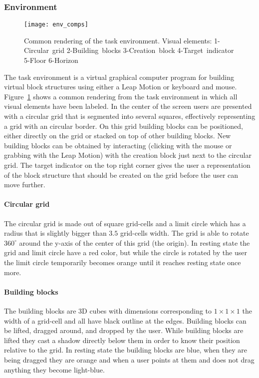 \subsubsection{Environment}

\begin{figure}[H]
\centering
\texttt{[image: env\_comps]}
\caption{\label{fig:environmentcomps} Common rendering of the task environment. Visual elements: 1-Circular~grid 2-Building~blocks 3-Creation~block 4-Target~indicator 5-Floor 6-Horizon}
\end{figure}

\noindent The task environment is a virtual graphical computer program for building virtual block structures using either a Leap Motion or keyboard and mouse. Figure~\ref{fig:environmentcomps} shows a common rendering from the task environment in which all visual elements have been labeled. In the center of the screen users are presented with a circular grid that is segmented into several squares, effectively representing a grid with an circular border. On this grid building blocks can be positioned, either directly on the grid or stacked on top of other building blocks. New building blocks can be obtained by interacting (clicking with the mouse or grabbing with the Leap Motion) with the creation block just next to the circular grid. The target indicator on the top right corner gives the user a representation of the block structure that should be created on the grid before the user can move further.

\paragraph{Circular grid}
The circular grid is made out of square grid-cells and a limit circle which has a radius that is slightly bigger than $3.5$ grid-cells width. The grid is able to rotate $360^{\circ}$ around the y-axis of the center of this grid (the origin). In resting state the grid and limit circle have a red color, but while the circle is rotated by the user the limit circle temporarily becomes orange until it reaches resting state once more. 

\paragraph{Building blocks}
The building blocks are 3D cubes with dimensions corresponding to $1\times 1\times 1$ the width of a grid-cell and all have black outline at the edges. Building blocks can be lifted, dragged around, and dropped by the user. While building blocks are lifted they cast a shadow directly below them in order to know their position relative to the grid. In resting state the building blocks are blue, when they are being dragged they are orange and when a user points at them and does not drag anything they become light-blue. 

